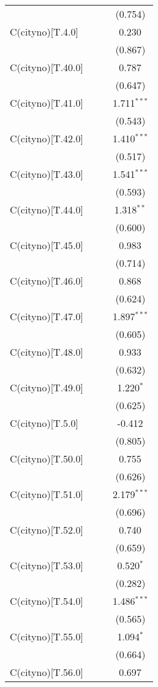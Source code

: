\begin{table}[!htbp]
\begin{tabular}{@{\extracolsep{5pt}}lccc}
& & & (0.754) \\
 C(cityno)[T.4.0] & & & 0.230$^{}$ \\
& & & (0.867) \\
 C(cityno)[T.40.0] & & & 0.787$^{}$ \\
& & & (0.647) \\
 C(cityno)[T.41.0] & & & 1.711$^{***}$ \\
& & & (0.543) \\
 C(cityno)[T.42.0] & & & 1.410$^{***}$ \\
& & & (0.517) \\
 C(cityno)[T.43.0] & & & 1.541$^{***}$ \\
& & & (0.593) \\
 C(cityno)[T.44.0] & & & 1.318$^{**}$ \\
& & & (0.600) \\
 C(cityno)[T.45.0] & & & 0.983$^{}$ \\
& & & (0.714) \\
 C(cityno)[T.46.0] & & & 0.868$^{}$ \\
& & & (0.624) \\
 C(cityno)[T.47.0] & & & 1.897$^{***}$ \\
& & & (0.605) \\
 C(cityno)[T.48.0] & & & 0.933$^{}$ \\
& & & (0.632) \\
 C(cityno)[T.49.0] & & & 1.220$^{*}$ \\
& & & (0.625) \\
 C(cityno)[T.5.0] & & & -0.412$^{}$ \\
& & & (0.805) \\
 C(cityno)[T.50.0] & & & 0.755$^{}$ \\
& & & (0.626) \\
 C(cityno)[T.51.0] & & & 2.179$^{***}$ \\
& & & (0.696) \\
 C(cityno)[T.52.0] & & & 0.740$^{}$ \\
& & & (0.659) \\
 C(cityno)[T.53.0] & & & 0.520$^{*}$ \\
& & & (0.282) \\
 C(cityno)[T.54.0] & & & 1.486$^{***}$ \\
& & & (0.565) \\
 C(cityno)[T.55.0] & & & 1.094$^{*}$ \\
& & & (0.664) \\
 C(cityno)[T.56.0] & & & 0.697$^{}$ \\

\end{tabular}
\end{table}
